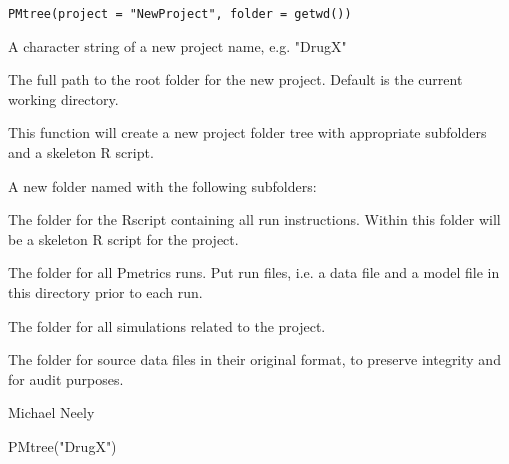 \documentclass[a4paper]{book}
\begin{document}
%
\begin{Usage}
\begin{verbatim}
PMtree(project = "NewProject", folder = getwd())
\end{verbatim}
\end{Usage}
%
\begin{Arguments}
\begin{ldescription}
\item[\code{project}] A character string of a new project name, e.g. "DrugX"

\item[\code{folder}] The full path to the root folder for the new project.  Default is the
current working directory.
\end{ldescription}
\end{Arguments}
%
\begin{Details}\relax
This function will create a new project folder tree with appropriate subfolders and a skeleton R script.
\end{Details}
%
\begin{Value}
A new folder named  with the following subfolders:
\begin{ldescription}
\item[\code{Rscript }] The folder for the Rscript containing all run instructions.
Within this folder will be a skeleton R script for the project.
\item[\code{Runs }] The folder for all Pmetrics runs.  Put run files, i.e. a data file and a
model file in this directory prior to each run.
\item[\code{Sim }] The folder for all simulations related to the project.
\item[\code{src }] The folder for source data files in their original format, to preserve
integrity and for audit purposes.
\end{ldescription}
\end{Value}
%
\begin{Author}\relax
Michael Neely
\end{Author}
%
\begin{SeeAlso}\relax
{}
\end{SeeAlso}
%
\begin{Examples}
\begin{ExampleCode}
PMtree("DrugX")
\end{ExampleCode}
\end{Examples}
\end{document}
